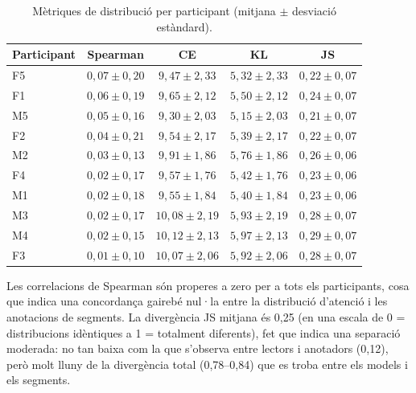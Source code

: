 \iftables
\begin{table}[htbp]
\small
\centering
\begin{tabular}{lcccc}
\toprule
\textbf{Participant} & \textbf{Spearman} & \textbf{CE} & \textbf{KL} & \textbf{JS} \\
\midrule
F5 & $0,07 \pm 0,20$ & $9,47 \pm 2,33$ & $5,32 \pm 2,33$ & $0,22 \pm 0,07$ \\
F1 & $0,06 \pm 0,19$ & $9,65 \pm 2,12$ & $5,50 \pm 2,12$ & $0,24 \pm 0,07$ \\
M5 & $0,05 \pm 0,16$ & $9,30 \pm 2,03$ & $5,15 \pm 2,03$ & $0,21 \pm 0,07$ \\
F2 & $0,04 \pm 0,21$ & $9,54 \pm 2,17$ & $5,39 \pm 2,17$ & $0,22 \pm 0,07$ \\
M2 & $0,03 \pm 0,13$ & $9,91 \pm 1,86$ & $5,76 \pm 1,86$ & $0,26 \pm 0,06$ \\
F4 & $0,02 \pm 0,17$ & $9,57 \pm 1,76$ & $5,42 \pm 1,76$ & $0,23 \pm 0,06$ \\
M1 & $0,02 \pm 0,18$ & $9,55 \pm 1,84$ & $5,40 \pm 1,84$ & $0,23 \pm 0,06$ \\
M3 & $0,02 \pm 0,17$ & $10,08 \pm 2,19$ & $5,93 \pm 2,19$ & $0,28 \pm 0,07$ \\
M4 & $0,02 \pm 0,15$ & $10,12 \pm 2,13$ & $5,97 \pm 2,13$ & $0,29 \pm 0,07$ \\
F3 & $0,01 \pm 0,10$ & $10,07 \pm 2,06$ & $5,92 \pm 2,06$ & $0,28 \pm 0,07$ \\
\bottomrule
\end{tabular}
\caption{Mètriques de distribució per participant (mitjana $\pm$ desviació estàndard).}
\label{tab:per_participant_metrics}
\end{table}
\fi

Les correlacions de Spearman són properes a zero per a tots els participants, cosa que indica una concordança gairebé nul·la entre la distribució d'atenció i les anotacions de segments.
La divergència JS mitjana és 0,25 (en una escala de 0 = distribucions idèntiques a 1 = totalment diferents), fet que indica una separació moderada: no tan baixa com la que s'observa entre lectors i anotadors (0,12), però molt lluny de la divergència total (0,78--0,84) que es troba entre els models i els segments.

